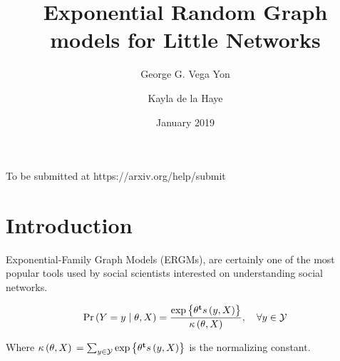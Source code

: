 \documentclass{article}
\title{Exponential Random Graph models for Little Networks}
\author{George G. Vega Yon \and Kayla de la Haye}
\date{January 2019}
\begin{document}
\maketitle

To be submitted at https://arxiv.org/help/submit

\section{Introduction}

Exponential-Family Graph Models (ERGMs), are certainly one of the most popular tools used by social scientists interested on understanding social networks.

\begin{equation}
\label{eq:ergm}
  \Prcond{\Adjmat = \adjmat}{\params, \Indepvar} = \frac{%
  	\exp{\transpose{\params}\sufstats{\adjmat, \Indepvar}}%
  }{
  	\kappa\left(\params, \Indepvar\right)
  },\quad\forall \adjmat\in\ADJMAT
\end{equation}

Where $\kappa\left(\theta, X\right){} = \sum_{y\in\mathcal{Y}}\mbox{exp}\left\{{\theta}^\mathbf{t}s\left(y, X\right)\right\}$ is the normalizing constant.
\end{document}
